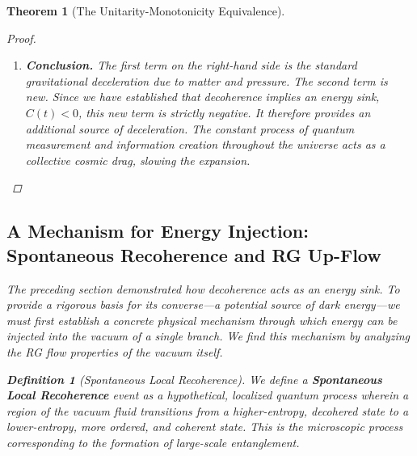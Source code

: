 \documentclass[11pt, letterpaper]{report}
\theoremstyle{plain} %
\newtheorem{theorem}{Theorem}[chapter]
\theoremstyle{definition} %
\newtheorem{definition}{Definition}[chapter]
\theoremstyle{remark} %
\begin{document}
\begin{theorem}[The Unitarity-Monotonicity Equivalence]
\begin{proof}
\begin{enumerate}
    \item \textbf{Conclusion.} The first term on the right-hand side is the standard gravitational deceleration due to matter and pressure. The second term is new. Since we have established that decoherence implies an energy sink, $C(t)<0$, this new term is strictly negative. It therefore provides an additional source of deceleration. The constant process of quantum measurement and information creation throughout the universe acts as a collective cosmic drag, slowing the expansion.
\end{enumerate}
\end{proof}

\subsection{A Mechanism for Energy Injection: Spontaneous Recoherence and RG Up-Flow}
\label{subsec:recoherence_rg_upflow}

The preceding section demonstrated how decoherence acts as an energy sink. To provide a rigorous basis for its converse—a potential source of dark energy—we must first establish a concrete physical mechanism through which energy can be injected into the vacuum of a single branch. We find this mechanism by analyzing the RG flow properties of the vacuum itself.

\begin{definition}[Spontaneous Local Recoherence]
We define a \textbf{Spontaneous Local Recoherence} event as a hypothetical, localized quantum process wherein a region of the vacuum fluid transitions from a higher-entropy, decohered state to a lower-entropy, more ordered, and coherent state. This is the microscopic process corresponding to the formation of large-scale entanglement.
\end{definition}


\end{theorem}
\end{document}
